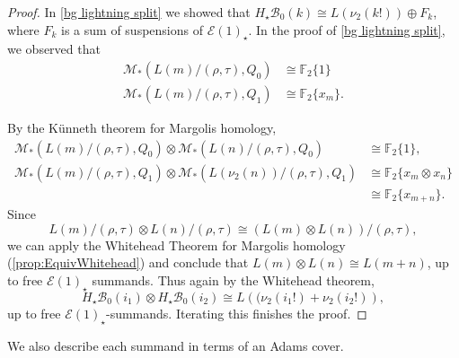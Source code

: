 \documentclass{amsart}
\theoremstyle{plain}
\numberwithin{equation}{section}
\numberwithin{figure}{section}
\newcommand{\mF}{{\mathbb F}}
\newcommand{\cB}{{\mathcal B}}
\newcommand{\cE}{{\mathcal E}}
\newcommand{\cM}{{\mathcal M}}
\newcommand{\0}{\langle 0 \rangle }
\begin{document}
\begin{proof}
    In \cref{bg lightning split} we showed that $H_{\star}\cB_{0}(k) \cong L(\nu_{2}(k!)) \oplus F_{k}$, where $F_{k}$ is a sum of suspensions of $\cE(1)_{\star}$. In the proof of \cref{bg lightning split}, we observed that 
    \begin{align*}
        \cM_{*}\left(L(m) /(\rho,\tau), Q_{0}\right) & \cong \mF_{2}\{1\} \\
        \cM_{*}\left( L(m)/(\rho,\tau), Q_{1}\right) & \cong \mF_{2}\{x_{m} \} .
    \end{align*}

    By the K\"{u}nneth theorem for Margolis homology,
    \begin{align*}
         \cM_{*}  \left(L(m) /(\rho,\tau), Q_{0}\right) \otimes \cM_{*}\left( L(n)/(\rho,\tau), Q_{0}\right) & \cong \mF_{2}\{1\}, \\
         \cM_{*}  \left(L(m)/(\rho,\tau), Q_{1}\right) \otimes \cM_{*}\left(  L(\nu_{2}(n))/(\rho,\tau), Q_{1}\right) & \cong \mF_{2}\{x_{m} \otimes x_{n}\} \\
         & \cong \mF_{2}\{x_{m+n}\}.
    \end{align*}
Since  
    \begin{equation}\label{eqn:iffy}
        L(m)/(\rho,\tau) \otimes L(n)/(\rho,\tau) \cong \left( L (m) \otimes L(n)\right)/(\rho,\tau),
    \end{equation}
     we can apply the Whitehead Theorem for Margolis homology (\cref{prop:EquivWhitehead}) and conclude that $L(m) \otimes L(n) \cong L(m + n)$, up to free $\cE(1)_{\star}$ summands. Thus again by the Whitehead theorem, 
    \[
    H_{\star}\cB_{0}(i_{1}) \otimes H_{\star}\cB_{0}(i_{2}) \cong L\left((\nu_{2}(i_{1}!) + \nu_{2}(i_{2}!)\right),
    \]
    up to free $\cE(1)_{\star}$-summands. Iterating this finishes the proof.
\end{proof}

We also describe each summand in terms of an Adams cover. 
\end{document}
